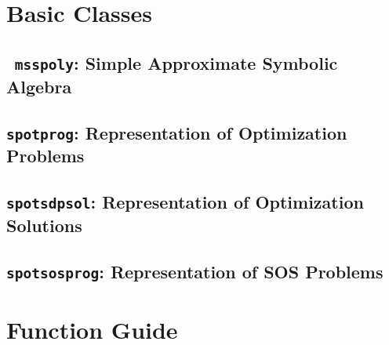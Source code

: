 \documentclass{scrartcl}
\newcommand{\msspoly}{\lstinline{ msspoly}\xspace}
\newcommand{\spotprog}{\lstinline{spotprog}\xspace}
\newcommand{\spotsdpsol}{\lstinline{spotsdpsol}\xspace}
\newcommand{\spotsosprog}{\lstinline{spotsosprog}\xspace}
\begin{document}
\section{Basic Classes}
\subsection{\msspoly: Simple Approximate Symbolic Algebra}
\subsection{\spotprog: Representation of Optimization Problems}
\subsection{\spotsdpsol: Representation of Optimization Solutions}
\subsection{\spotsosprog: Representation of SOS Problems}
\section{Function Guide}
\end{document}
